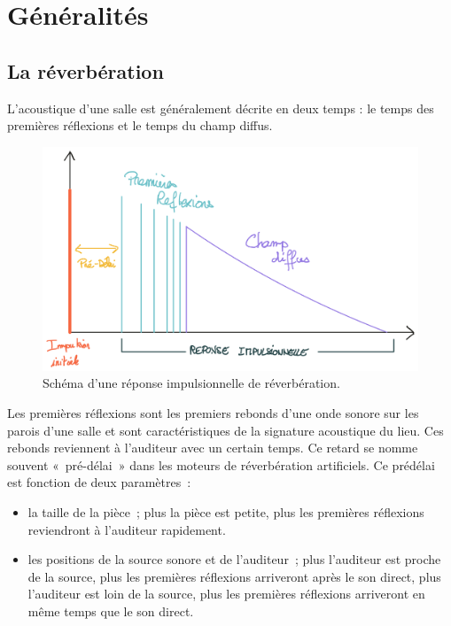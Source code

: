 \documentclass[
]{book}
\providecommand{\tightlist}{%
  \setlength{\itemsep}{0pt}\setlength{\parskip}{0pt}}
\begin{document}
\hypertarget{guxe9nuxe9ralituxe9s}{%
\section{Généralités}\label{guxe9nuxe9ralituxe9s}}

\hypertarget{la-ruxe9verbuxe9ration}{%
\subsection{La réverbération}\label{la-ruxe9verbuxe9ration}}

L'acoustique d'une salle est généralement décrite en deux temps : le temps des premières réflexions et le temps du champ diffus.

\begin{figure}

{\centering \includegraphics{_resources/drawings/reverb} 

}

\caption{Schéma d'une réponse impulsionnelle de réverbération.}\label{fig:unnamed-chunk-9}
\end{figure}

Les premières réflexions sont les premiers rebonds d'une onde sonore sur les parois d'une salle et sont caractéristiques de la signature acoustique du lieu. Ces rebonds reviennent à l'auditeur avec un certain temps. Ce retard se nomme souvent «~pré-délai~» dans les moteurs de réverbération artificiels. Ce prédélai est fonction de deux paramètres~:

\begin{itemize}
\tightlist
\item
  la taille de la pièce~; plus la pièce est petite, plus les premières réflexions reviendront à l'auditeur rapidement.
\item
  les positions de la source sonore et de l'auditeur~; plus l'auditeur est proche de la source, plus les premières réflexions arriveront après le son direct, plus l'auditeur est loin de la source, plus les premières réflexions arriveront en même temps que le son direct.
\end{itemize}
\end{document}
